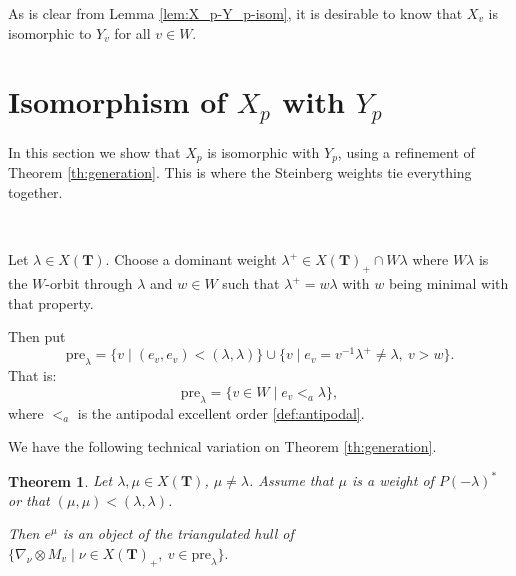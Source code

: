 \documentclass[sn-mathphys-num]{sn-jnl}%
\newcommand{\pre}{{\mathrm{pre}}}
\newcommand{\bt}{\mathbf T}
\newtheorem{theorem}{Theorem}[section]
\theoremstyle{definition}
\begin{document}
As is clear from Lemma \ref{lem:X_p-Y_p-isom}, it is desirable to know  that $X_v$ is isomorphic to $Y_v$ for all $v\in W$.

\section{Isomorphism of $X_p$ with $Y_p$}\label{sec:X_p&Y_p-isom}
In this section we show that $X_p$
is isomorphic with $Y_p$, using a refinement of Theorem \ref{th:generation}. This is where the Steinberg weights tie everything together.

\

Let $\lambda \in X( \bt)$. Choose a dominant weight $\lambda ^+\in X({\bt})_+\cap W\lambda$ where $W\lambda$ is the $W$-orbit through $\lambda$ and $w\in W$ such that $\lambda ^+=w\lambda$ with $w$ being minimal with that property. 

Then put $$\pre_\lambda=\{v\mid (e_v,e_v)<(\lambda,\lambda)\}\cup\{ v\mid e_v=v^{-1}\lambda ^+\neq \lambda,~v>w\}.$$
That is:
$$\pre_\lambda=\{v\in W\mid e_v<_a\lambda\},$$
where $<_a$ is the antipodal excellent order \ref{def:antipodal}.


We have the following technical variation on Theorem \ref{th:generation}.

\begin{theorem}%
\label{th:cone generation}
  Let $\lambda,\mu\in X(\bt)$, $\mu\neq\lambda$.
  Assume that $\mu$
  is a weight of $P(-\lambda)^*$ or
  that $(\mu,\mu)<(\lambda,\lambda)$.
  
  Then
  $e^\mu$ is an object of the triangulated hull of
$\{\nabla_\nu\otimes M_v\mid \nu\in X( \bt)_+,~v\in\pre_\lambda\}.$
  \end{theorem}
  
\end{document}
